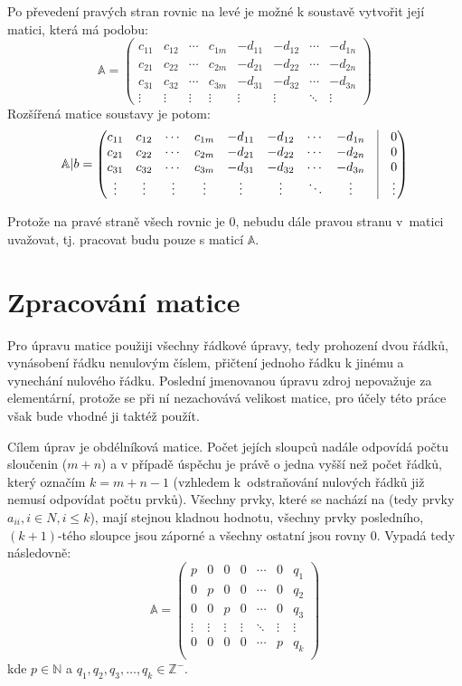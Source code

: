 \documentclass[12pt,a4paper]{report}
\begin{document}
Po převedení pravých stran rovnic na levé je možné k soustavě vytvořit její matici, která má podobu:
$$\mathbb{A} = \begin{pmatrix}
	c_{11} & c_{12} & \cdots & c_{1m} & -d_{11} & -d_{12} & \cdots & -d_{1n}\\
	c_{21} & c_{22} & \cdots & c_{2m} & -d_{21} & -d_{22} & \cdots & -d_{2n}\\
	c_{31} & c_{32} & \cdots & c_{3m} & -d_{31} & -d_{32} & \cdots & -d_{3n}\\
    \vdots & \vdots & \vdots & \vdots & \vdots  & \vdots  & \ddots & \vdots 
\end{pmatrix}$$
Rozšířená matice soustavy je potom:
$$\mathbb{A}|b = \begin{pmatrix}
	c_{11} & c_{12} & \cdots & c_{1m} & -d_{11} & -d_{12} & \cdots & -d_{1n} & \vline & 0\\
	c_{21} & c_{22} & \cdots & c_{2m} & -d_{21} & -d_{22} & \cdots & -d_{2n} & \vline & 0\\
	c_{31} & c_{32} & \cdots & c_{3m} & -d_{31} & -d_{32} & \cdots & -d_{3n} & \vline & 0\\
    \vdots & \vdots & \vdots & \vdots & \vdots  & \vdots  & \ddots &  \vdots & \vline & \vdots
\end{pmatrix}$$

Protože na pravé straně všech rovnic je 0, nebudu dále pravou stranu v~matici uvažovat, tj. pracovat budu pouze s maticí $ \mathbb{A} $.

\section{Zpracování matice}
Pro úpravu matice použiji všechny řádkové úpravy, tedy prohození dvou řádků, vynásobení řádku nenulovým číslem, přičtení jednoho řádku k jinému a vynechání nulového řádku. \cite{czu} Poslední jmenovanou úpravu zdroj nepovažuje za elementární, protože se při ní nezachovává velikost matice, pro účely této práce však bude vhodné ji taktéž použít.

\label{cilova_matice}
Cílem úprav je obdélníková matice. Počet jejích sloupců nadále odpovídá počtu sloučenin ($ m + n $) a v případě úspěchu je právě o jedna vyšší než počet řádků, který označím $ k = m + n - 1 $ (vzhledem k~odstraňování nulových řádků již nemusí odpovídat počtu prvků). Všechny prvky, které se nachází na  (tedy prvky $ a_{ii}, i \in N, i \leq k $), mají stejnou kladnou hodnotu, všechny prvky posledního, $(k+1) $-tého sloupce jsou záporné a všechny ostatní jsou rovny 0. Vypadá tedy následovně:
$$\mathbb{A} = \begin{pmatrix}
	p & 0 & 0 & 0 & \cdots & 0 & q_1 \\
	0 & p & 0 & 0 & \cdots & 0 & q_2 \\
	0 & 0 & p & 0 & \cdots & 0 & q_3 \\
    \vdots&\vdots&\vdots&\vdots&\ddots&\vdots&\vdots \\
	0 & 0 & 0 & 0 & \cdots & p & q_k \\
\end{pmatrix}$$
kde $ p \in \mathbb{N} $ a $q_1,q_2,q_3,\ldots,q_k \in \mathbb{Z}^- $. 
\end{document}
